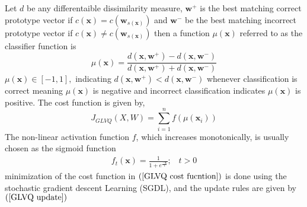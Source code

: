 Let\hspace{2pt} $d$\hspace{2pt} be any differentaible dissimilarity measure, \hspace{2pt}$\mathbf{w}^{+}$ \hspace{2pt}is the best matching correct prototype vector if\hspace{2pt} $c\left( \mathbf{x}\right) = c\left( \mathbf{w}_{ s\left( \mathbf{x}\right) }\right)$
and\hspace{2pt} $\mathbf{w}^{-}$\hspace{2pt} be the best matching incorrect prototype vector if\hspace{2pt} $c\left( \mathbf{x}\right) \neq c\left( \mathbf{w}_{ s\left( \mathbf{x}\right) }\right)$\hspace{2pt} then a function\hspace{2pt} $\mu\left( \mathbf{x}\right)$\hspace{2pt} referred to as the classifier function is
\begin{equation*}%
	\mu \left( \mathbf{x}\right) =\frac{d\left( \mathbf{x},\mathbf{w}^{+}\right)-d\left( \mathbf{x},\mathbf{w}^{-}\right)  }{d\left( \mathbf{x},\mathbf{w}^{+}\right)+d\left( \mathbf{x},\mathbf{w}^{-} \right) }
\end{equation*}
$\mu\left( \mathbf{x}\right)\in\left[ -1,1\right], $ indicating\hspace{2pt} $d\left( \mathbf{x},\mathbf{w}^{+}\right)<d\left( \mathbf{x},\mathbf{w}^{-}\right)$\hspace{2pt} whenever classification is correct  meaning\hspace{2pt} $\mu\left( \mathbf{x}\right) $\hspace{2pt} is negative and incorrect classification indicates\hspace{2pt} $\mu\left( \mathbf{x}\right) $ \hspace{2pt}is positive. The cost function is given by,
\begin{equation}\label{GLVQ cost fucntion}
	J_{GLVQ}\left( X,W\right) =\sum_{i=1}^{n}f\left( \mu\left( \mathbf{x}_i\right) \right) 
\end{equation}
The non-linear activation function $f$, which increases monotonically, is usually chosen as the sigmoid function 
\begin{align*}
	f_t\left( \mathbf{x}\right) =\frac{1}{1+e^{\frac{-\mathbf{x}}{t}}} ;\hspace{10pt} t>0
\end{align*}
minimization of the cost function in  $\left( \ref{GLVQ cost fucntion}\right)$ is done using the stochastic gradient descent Learning (SGDL), and the update rules are given by $\left( \ref{GLVQ update}\right) $
